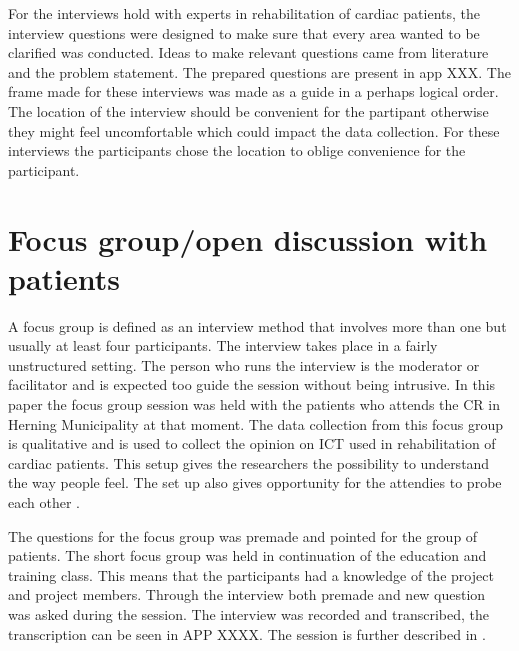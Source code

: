 For the interviews hold with experts in rehabilitation of cardiac patients, the interview questions were designed to make sure that every area wanted to be clarified was conducted. Ideas to make relevant questions came from literature and the problem statement. The prepared questions are present in app XXX. The frame made for these interviews was made as a guide in a perhaps logical order. The location of the interview should be convenient for the partipant otherwise they might feel uncomfortable which could impact the data collection. For these interviews the participants chose the location to oblige convenience for the participant. 

\section {Focus group/open discussion with patients} \label{focusgroup}

A focus group is defined as an interview method that involves more than one but usually at least four participants. The interview takes place in a fairly unstructured setting. The person who runs the interview is the moderator or facilitator and is expected too guide the session without being intrusive. In this paper the focus group session was held with the patients who attends the CR in Herning Municipality at that moment. The data collection from this focus group is qualitative and is used to collect the opinion on ICT used in rehabilitation of cardiac patients. This setup gives the researchers the possibility to understand the way people feel. The set up also gives opportunity for the attendies to probe each other \cite{brymanbell}. 

The questions for the focus group was premade and pointed for the group of patients. The short focus group was held in continuation of the education and training class. This means that the participants had a knowledge of the project and project members.
Through the interview both premade and new question was asked during the session. The interview was recorded and transcribed, the transcription can be seen in APP XXXX. The session is further described in . 

